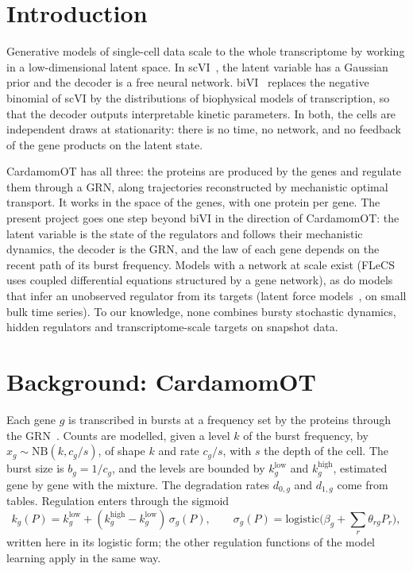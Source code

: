 \documentclass[a4paper, 11pt]{article}
\newcommand{\NB}{\mathrm{NB}}
\newcommand{\klow}{k^{\mathrm{low}}}
\newcommand{\khigh}{k^{\mathrm{high}}}
\theoremstyle{plain}
\theoremstyle{remark}
\begin{document}
\section{Introduction}\label{sec:intro}

Generative models of single-cell data scale to the whole transcriptome by working in a low-dimensional latent space. In scVI~\cite{lopez2018deep}, the latent variable has a Gaussian prior and the decoder is a free neural network. biVI~\cite{carilli2024biophysical} replaces the negative binomial of scVI by the distributions of biophysical models of transcription, so that the decoder outputs interpretable kinetic parameters. In both, the cells are independent draws at stationarity: there is no time, no network, and no feedback of the gene products on the latent state.

CardamomOT has all three: the proteins are produced by the genes and regulate them through a GRN, along trajectories reconstructed by mechanistic optimal transport. It works in the space of the genes, with one protein per gene. The present project goes one step beyond biVI in the direction of CardamomOT: the latent variable is the state of the regulators and follows their mechanistic dynamics, the decoder is the GRN, and the law of each gene depends on the recent path of its burst frequency. Models with a network at scale exist (FLeCS~\cite{bertin2025scalable} uses coupled differential equations structured by a gene network), as do models that infer an unobserved regulator from its targets (latent force models~\cite{moss2020gene}, on small bulk time series). To our knowledge, none combines bursty stochastic dynamics, hidden regulators and transcriptome-scale targets on snapshot data.

\section{Background: CardamomOT}\label{sec:background}

Each gene $g$ is transcribed in bursts at a frequency set by the proteins through the GRN~\cite{herbachinferring2017}. Counts are modelled, given a level $k$ of the burst frequency, by $x_g \sim \NB(k, c_g/s)$, of shape $k$ and rate $c_g/s$, with $s$ the depth of the cell. The burst size is $b_g = 1/c_g$, and the levels are bounded by $\klow_g$ and $\khigh_g$, estimated gene by gene with the mixture. The degradation rates $d_{0,g}$ and $d_{1,g}$ come from tables. Regulation enters through the sigmoid
\[
k_g(P) = \klow_g + (\khigh_g - \klow_g)\,\sigma_g(P), \qquad \sigma_g(P) = \mathrm{logistic}\Big(\beta_g + \sum_r \theta_{rg} P_r\Big),
\]
written here in its logistic form; the other regulation functions of the model learning apply in the same way.
\end{document}
